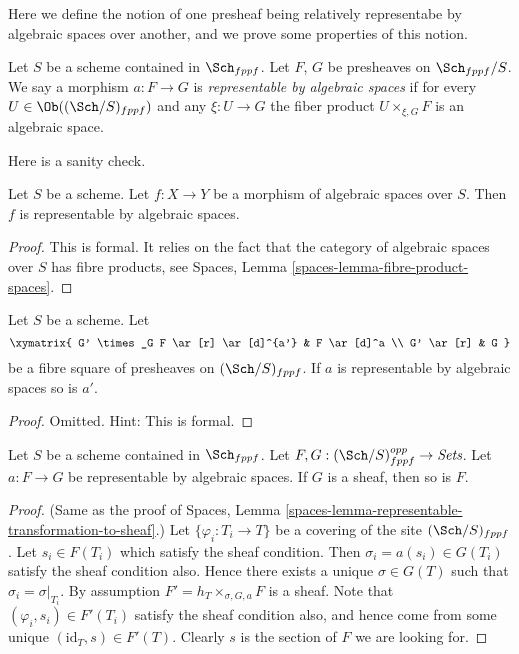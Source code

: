 \noindent
Here we define the notion of one presheaf being relatively representabe
by algebraic spaces over another, and we prove some properties of this notion.

\begin{definition}
\label{definition-morphism-representable-by-spaces}
Let $S$ be a scheme contained in $\Sch_{fppf}$.
Let $F$, $G$ be presheaves on $\Sch_{fppf}/S$.
We say a morphism $a : F \to G$ is
{\it representable by algebraic spaces}
if for every $U \in \Ob((\Sch/S)_{fppf})$ and
any $\xi : U \to G$ the fiber product $U \times_{\xi, G} F$
is an algebraic space.
\end{definition}

\noindent
Here is a sanity check.

\begin{lemma}
\label{lemma-morphism-spaces-is-representable-by-spaces}
Let $S$ be a scheme.
Let $f : X \to Y$ be a morphism of algebraic spaces over $S$.
Then $f$ is representable by algebraic spaces.
\end{lemma}

\begin{proof}
This is formal. It relies on the fact that
the category of algebraic spaces over $S$ has fibre products, see
Spaces, Lemma \ref{spaces-lemma-fibre-product-spaces}.
\end{proof}

\begin{lemma}
\label{lemma-base-change-transformation}
Let $S$ be a scheme. Let
$$
\xymatrix{
G' \times_G F \ar[r] \ar[d]^{a'} & F \ar[d]^a \\
G' \ar[r] & G
}
$$
be a fibre square of presheaves on $(\Sch/S)_{fppf}$.
If $a$ is representable by algebraic spaces so is $a'$.
\end{lemma}

\begin{proof}
Omitted. Hint: This is formal.
\end{proof}

\begin{lemma}
\label{lemma-representable-by-spaces-transformation-to-sheaf}
Let $S$ be a scheme contained in $\Sch_{fppf}$.
Let $F, G : (\Sch/S)_{fppf}^{opp} \to \textit{Sets}$.
Let $a : F \to G$ be representable by algebraic spaces.
If $G$ is a sheaf, then so is $F$.
\end{lemma}

\begin{proof}
(Same as the proof of
Spaces, Lemma \ref{spaces-lemma-representable-transformation-to-sheaf}.)
Let $\{\varphi_i : T_i \to T\}$ be a covering of the site
$(\Sch/S)_{fppf}$.
Let $s_i \in F(T_i)$ which satisfy the sheaf condition.
Then $\sigma_i = a(s_i) \in G(T_i)$ satisfy the sheaf condition
also. Hence there exists a unique $\sigma \in G(T)$ such
that $\sigma_i = \sigma|_{T_i}$. By assumption
$F' = h_T \times_{\sigma, G, a} F$ is a sheaf.
Note that $(\varphi_i, s_i) \in F'(T_i)$ satisfy the
sheaf condition also, and hence come from some unique
$(\text{id}_T, s) \in F'(T)$. Clearly $s$ is the section of
$F$ we are looking for.
\end{proof}


